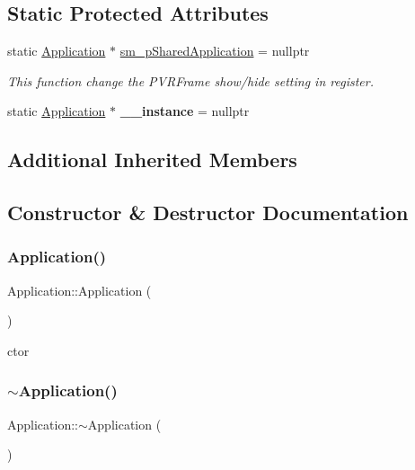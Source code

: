\subsection*{Static Protected Attributes}
\begin{DoxyCompactItemize}
\item 
static \hyperlink{classApplication}{Application} $\ast$ \hyperlink{classApplication_a5bfb91abd0f08661158fdca1466fc276}{sm\+\_\+p\+Shared\+Application} = nullptr
\begin{DoxyCompactList}\small\item\em This function change the P\+V\+R\+Frame show/hide setting in register. \end{DoxyCompactList}\item 
\mbox{\label{classApplication_a5cf5ae6c2724e1bebd0d296536e476d5}} 
static \hyperlink{classApplication}{Application} $\ast$ {\bfseries \+\_\+\+\_\+instance} = nullptr
\end{DoxyCompactItemize}
\subsection*{Additional Inherited Members}


\subsection{Constructor \& Destructor Documentation}
\mbox{\label{classApplication_afa8cc05ce6b6092be5ecdfdae44e05f8}} 
\subsubsection{\texorpdfstring{Application()}{Application()}\hspace{0.1cm}{\footnotesize\ttfamily [1/11]}}
{\footnotesize\ttfamily Application\+::\+Application (\begin{DoxyParamCaption}{ }\end{DoxyParamCaption})}

ctor \mbox{\label{classApplication_a748bca84fefb9c12661cfaa2f623748d}} 
\subsubsection{\texorpdfstring{$\sim$\+Application()}{~Application()}\hspace{0.1cm}{\footnotesize\ttfamily [1/11]}}
{\footnotesize\ttfamily Application\+::$\sim$\+Application (\begin{DoxyParamCaption}{ }\end{DoxyParamCaption})\hspace{0.3cm}{\ttfamily [virtual]}}


